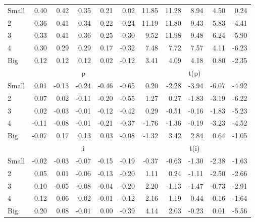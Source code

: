 \begin{tabular}{lrrrrrrrrrr}
    Small   & 0.40  & 0.42  & 0.35  & 0.21  & 0.02  & 11.85  & 11.28  & 8.94  & 4.50  & 0.24  \\
         2  & 0.36  & 0.41  & 0.34  & 0.22  & -0.24  & 11.19  & 11.80  & 9.43  & 5.83  & -4.41  \\
         3  & 0.33  & 0.41  & 0.36  & 0.25  & -0.30  & 9.52  & 11.98  & 9.48  & 6.24  & -5.90  \\
         4  & 0.30  & 0.29  & 0.29  & 0.17  & -0.32  & 7.48  & 7.72  & 7.57  & 4.11  & -6.23  \\
    Big     & 0.12  & 0.12  & 0.12  & 0.02  & -0.12  & 3.41  & 4.09  & 4.18  & 0.80  & -2.35  \\

  
    
      & \multicolumn{5}{c}{p} & \multicolumn{5}{c}{t(p)}
    
    \\
      \cmidrule(r){2-6} \cmidrule(r){7-11}

    Small   & 0.01  & -0.13  & -0.24  & -0.46  & -0.65  & 0.20  & -2.28  & -3.94  & -6.07  & -4.92  \\
         2  & 0.07  & 0.02  & -0.11  & -0.20  & -0.55  & 1.27  & 0.27  & -1.83  & -3.19  & -6.22  \\
         3  & 0.02  & -0.03  & -0.01  & -0.12  & -0.42  & 0.29  & -0.51  & -0.16  & -1.83  & -5.23  \\
         4  & -0.11  & -0.08  & -0.01  & -0.21  & -0.37  & -1.76  & -1.36  & -0.19  & -3.23  & -4.52  \\
    Big     & -0.07  & 0.17  & 0.13  & 0.03  & -0.08  & -1.32  & 3.42  & 2.84  & 0.64  & -1.05  \\

  
    
      & \multicolumn{5}{c}{i} & \multicolumn{5}{c}{t(i)}
    
    \\
      \cmidrule(r){2-6} \cmidrule(r){7-11}

    Small   & -0.02  & -0.03  & -0.07  & -0.15  & -0.19  & -0.37  & -0.63  & -1.30  & -2.38  & -1.63  \\
         2  & 0.05  & 0.01  & -0.06  & -0.13  & -0.20  & 1.11  & 0.24  & -1.11  & -2.50  & -2.66  \\
         3  & 0.10  & -0.05  & -0.08  & -0.04  & -0.20  & 2.20  & -1.13  & -1.47  & -0.73  & -2.91  \\
         4  & 0.12  & 0.06  & 0.02  & -0.01  & -0.12  & 2.16  & 1.19  & 0.44  & -0.16  & -1.64  \\
    Big     & 0.20  & 0.08  & -0.01  & 0.00  & -0.39  & 4.14  & 2.03  & -0.23  & 0.01  & -5.56  \\

  

  \bottomrule
\end{tabular}
